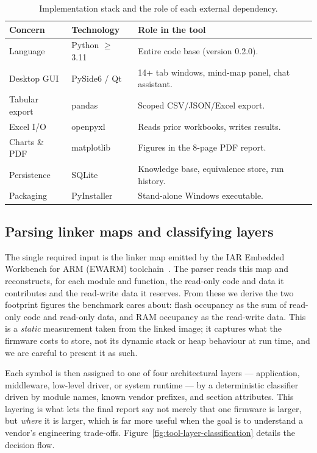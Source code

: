\begin{table}[H]
\centering
\caption{Implementation stack and the role of each external dependency.}
\label{tab:tool-stack}
\begin{tabularx}{\textwidth}{l l X}
\toprule
\textbf{Concern} & \textbf{Technology} & \textbf{Role in the tool} \\
\midrule
Language & Python $\geq$ 3.11 \cite{python} & Entire code base (version 0.2.0). \\
Desktop GUI & PySide6 / Qt \cite{pyside6} & 14+ tab windows, mind-map panel, chat assistant. \\
Tabular export & pandas \cite{pandas} & Scoped CSV/JSON/Excel export. \\
Excel I/O & openpyxl \cite{openpyxl} & Reads prior workbooks, writes results. \\
Charts \& PDF & matplotlib \cite{matplotlib} & Figures in the 8-page PDF report. \\
Persistence & SQLite \cite{sqlite} & Knowledge base, equivalence store, run history. \\
Packaging & PyInstaller \cite{pyinstaller} & Stand-alone Windows executable. \\
\bottomrule
\end{tabularx}
\end{table}

\subsection{Parsing linker maps and classifying layers}
\label{sec:tool-parsing}

The single required input is the linker map emitted by the IAR Embedded Workbench for ARM
(EWARM) toolchain~\cite{iar-ewarm}. The parser reads this map and reconstructs, for
each module and function, the read-only code and data it contributes and the read-write data
it reserves. From these we derive the two footprint figures the benchmark cares about: flash
occupancy as the sum of read-only code and read-only data, and RAM occupancy as the
read-write data. This is a \emph{static} measurement taken from the linked image; it captures
what the firmware costs to store, not its dynamic stack or heap behaviour at run time, and we
are careful to present it as such.

Each symbol is then assigned to one of four architectural layers --- application, middleware,
low-level driver, or system runtime --- by a deterministic classifier driven by module names,
known vendor prefixes, and section attributes. This layering is what lets the final report say
not merely that one firmware is larger, but \emph{where} it is larger, which is far more useful
when the goal is to understand a vendor's engineering trade-offs.
Figure~\ref{fig:tool-layer-classification} details the decision flow.

